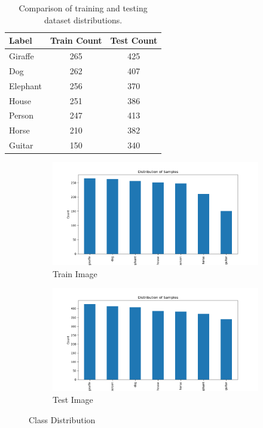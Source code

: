 \documentclass{article}
\begin{document}
\begin{table}[h]
    \centering
    \begin{tabular}{lcc}
    \toprule
    Label & Train Count & Test Count \\
    \midrule
    Giraffe   & 265 & 425 \\
    Dog       & 262 & 407 \\
    Elephant  & 256 & 370 \\
    House     & 251 & 386 \\
    Person    & 247 & 413 \\
    Horse     & 210 & 382 \\
    Guitar    & 150 & 340 \\
    \bottomrule
    \end{tabular}
    \caption{Comparison of training and testing dataset distributions.}
    \label{tab:dataset_distribution}
\end{table}

\begin{figure}[h!]
    \centering
    \begin{subfigure}{0.45\textwidth}
        \includegraphics[width=\textwidth]{./pic/class_distribution_1641.png}
        \caption{Train Image}
    \end{subfigure}
    \hfill %
    \begin{subfigure}{0.45\textwidth}
        \includegraphics[width=\textwidth]{./pic/class_distribution_2723.png}
        \caption{Test Image}
    \end{subfigure}
    \caption{Class Distribution}
    \label{fig:class_distribution}
\end{figure}
\end{document}
